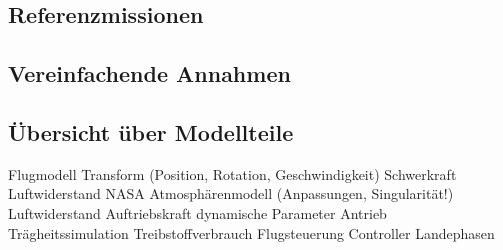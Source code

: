 \subsection{Referenzmissionen}
	

\subsection{Vereinfachende Annahmen}

\subsection{Übersicht über Modellteile}
Flugmodell
	Transform (Position, Rotation, Geschwindigkeit)
	Schwerkraft
	Luftwiderstand
		NASA Atmosphärenmodell (Anpassungen, Singularität!)
		Luftwiderstand
		Auftriebskraft
		dynamische Parameter
	Antrieb
		Trägheitssimulation
		Treibstoffverbrauch
Flugsteuerung
	Controller
	Landephasen